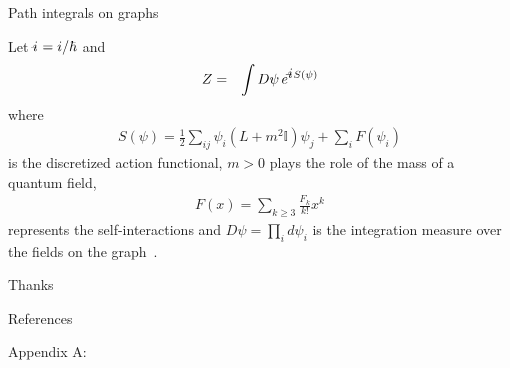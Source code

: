 \documentclass{beamer}
\newcommand{\shiftleft}[2]{\makebox[0pt][r]{\makebox[#1][l]{#2}}}
\newcommand{\hslashslash}{
  \shiftleft{15pt}{
    \raisebox{.14ex}{
        \scalebox{.7}{
          \rotatebox[origin=c]{0}{$-$}
      }
    }
  }
}
\newcommand{\ibar}{%
  {%
   \vphantom{d}%
   \ooalign{\kern.05em\smash{\hslashslash}\hidewidth\cr$i$\cr}%
   \kern.05em
  }%
}
\begin{document}
\begin{frame}{Path integrals on graphs}

Let $\ibar=i/\hbar$ and
\begin{eqnarray}
Z
&=&
\int D\psi\,
e^{\ibar S(\psi)}
\end{eqnarray}
where
\begin{eqnarray}
S(\psi)
=
\frac{1}{2}
\sum_{ij}
\psi_i
(L+m^2\mathbb{I})
\psi_j
+
\sum_i
F(\psi_i)
\end{eqnarray}
is the discretized action functional,
$m>0$ plays the role of the mass of a quantum field, 
\begin{eqnarray}
F(x)
=
\sum_{k\geq 3}
\frac{F_k}{k!}
x^k
\end{eqnarray}
represents the self-interactions
and
$D\psi = \prod_i d\psi_i$
is the integration measure over the fields on the graph~\cite{mnev2016graph}.

\end{frame}


\begin{frame}{}

\begin{center}
    Thanks
\end{center}

\end{frame}


\begin{frame}[allowframebreaks]{References}
        
        
\end{frame}


\begin{frame}{Appendix A:}


\end{frame}

\end{document}
